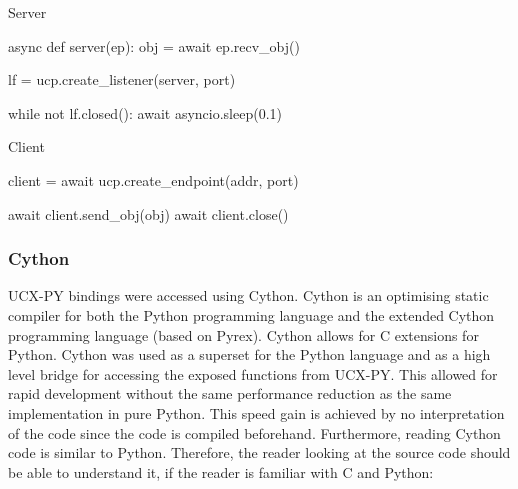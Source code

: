 \documentclass[a4paper,onecolumn]{article}
\begin{document}
\noindent\begin{minipage}{.45\textwidth}
Server
\begin{python}
async def server(ep):
    obj = await ep.recv_obj()

lf = ucp.create_listener(server, port) 

while not lf.closed():
    await asyncio.sleep(0.1)
\end{python}

\end{minipage}\hfill
\begin{minipage}{.45\textwidth}
Client
\begin{python}

client = await ucp.create_endpoint(addr, port)


await client.send_obj(obj)
await client.close()
 
 
\end{python}

\end{minipage}

%
%
%
%

\subsubsection{Cython}
UCX-PY bindings were accessed using Cython. Cython is an optimising static compiler for both the Python programming language and the extended Cython programming language (based on Pyrex). Cython allows for C extensions for Python. Cython was used as a superset for the Python language and as a high level bridge for accessing the exposed functions from UCX-PY. This allowed for rapid development without the same performance reduction as the same implementation in pure Python. This speed gain is achieved by no interpretation of the code since the code is compiled beforehand. Furthermore, reading Cython code is similar to Python. Therefore, the reader looking at the source code should be able to understand it, if the reader is familiar with C and Python:
\end{document}
